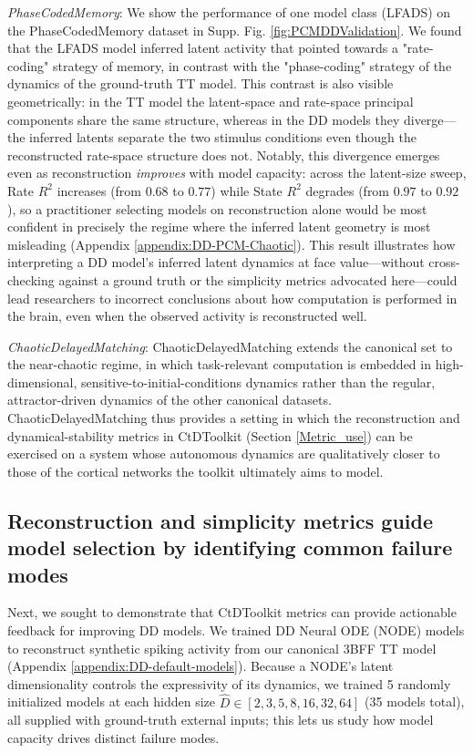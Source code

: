 \documentclass{article}
\begin{document}
\textit{PhaseCodedMemory}:
We show the performance of one model class (LFADS) on the PhaseCodedMemory dataset in Supp. Fig. \ref{fig:PCMDDValidation}. We found that the LFADS model inferred latent activity that pointed towards a "rate-coding" strategy of memory, in contrast with the "phase-coding" strategy of the dynamics of the ground-truth TT model. This contrast is also visible geometrically: in the TT model the latent-space and rate-space principal components share the same structure, whereas in the DD models they diverge—the inferred latents separate the two stimulus conditions even though the reconstructed rate-space structure does not. Notably, this divergence emerges even as reconstruction \textit{improves} with model capacity: across the latent-size sweep, Rate $R^2$ increases (from $0.68$ to $0.77$) while State $R^2$ degrades (from $0.97$ to $0.92$), so a practitioner selecting models on reconstruction alone would be most confident in precisely the regime where the inferred latent geometry is most misleading (Appendix \ref{appendix:DD-PCM-Chaotic}). This result illustrates how interpreting a DD model's inferred latent dynamics at face value---without cross-checking against a ground truth or the simplicity metrics advocated here---could lead researchers to incorrect conclusions about how computation is performed in the brain, even when the observed activity is reconstructed well.

\textit{ChaoticDelayedMatching}:
ChaoticDelayedMatching extends the canonical set to the near-chaotic regime, in which task-relevant computation is embedded in high-dimensional, sensitive-to-initial-conditions dynamics rather than the regular, attractor-driven dynamics of the other canonical datasets. ChaoticDelayedMatching thus provides a setting in which the reconstruction and dynamical-stability metrics in CtDToolkit (Section \ref{Metric_use}) can be exercised on a system whose autonomous dynamics are qualitatively closer to those of the cortical networks the toolkit ultimately aims to model.

\vspace{-0.2cm}
\subsection{Reconstruction and simplicity metrics guide model selection by identifying common failure modes \label{sec:recon_simplicity}}
\vspace{-0.2cm}

Next, we sought to demonstrate that CtDToolkit metrics can provide actionable feedback for improving DD models. We trained DD Neural ODE (NODE) models \cite{chen_neural_2018} to reconstruct synthetic spiking activity from our canonical 3BFF TT model (Appendix \ref{appendix:DD-default-models}). Because a NODE's latent dimensionality controls the expressivity of its dynamics, we trained 5 randomly initialized models at each hidden size $\hat{D}\in[2, 3, 5, 8, 16, 32, 64]$ (35 models total), all supplied with ground-truth external inputs; this lets us study how model capacity drives distinct failure modes.
\end{document}
